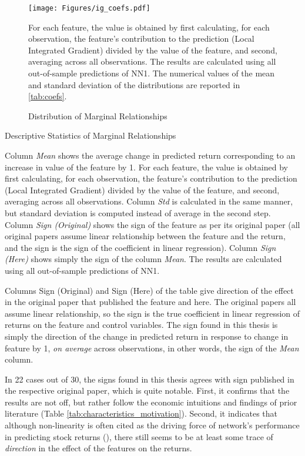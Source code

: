 	\begin{figure}
		\texttt{[image: Figures/ig\_coefs.pdf]}
		\caption{Distribution of Marginal Relationships}
		\label{fig:coefs}
		\medskip
		\small
		For each feature, the value is obtained by first calculating, for each observation, the feature's contribution to the prediction (Local Integrated Gradient) divided by the value of the feature, and second, averaging across all observations. The results are calculated using all out-of-sample predictions of NN1. The numerical values of the mean and standard deviation of the distributions are reported in \ref{tab:coefs}. 
	\end{figure} 
	
	\begin{table}
		\resizebox{\textwidth}{!}{}
		\caption{Descriptive Statistics of Marginal Relationships}
		\label{tab:coefs}
		\medskip
		\small
		Column \textit{Mean} shows the average change in predicted return corresponding to an increase in value of the feature by 1. For each feature, the value is obtained by first calculating, for each observation, the feature's contribution to the prediction (Local Integrated Gradient) divided by the value of the feature, and second, averaging across all observations. Column \textit{Std} is calculated in the same manner, but standard deviation is computed instead of average in the second step. Column \textit{Sign (Original)} shows the sign of the feature as per its original paper (all original papers assume linear relationship between the feature and the return, and the sign is the sign of the coefficient in linear regression). Column \textit{Sign (Here)} shows simply the sign of the column \textit{Mean}. The results are calculated using all out-of-sample predictions of NN1.
	\end{table}
	
	Columns Sign (Original) and Sign (Here) of the table give direction of the effect in the original paper that published the feature and here. The original papers all assume linear relationship, so the sign is the true coefficient in linear regression of returns on the feature and control variables. The sign found in this thesis is simply the direction of the change in predicted return in response to change in feature by 1, \textit{on average} across observations, in other words, the sign of the \textit{Mean} column. 
	
	In 22 cases out of 30, the signs found in this thesis agrees with sign published in the respective original paper, which is quite notable. First, it confirms that the results are not off, but rather follow the economic intuitions and findings of prior literature (Table \ref{tab:characteristics_motivation}). Second, it indicates that although non-linearity is often cited as the driving force of network's performance in predicting stock returns (\cite{gu2020empirical}), there still seems to be at least some trace of \textit{direction} in the effect of the features on the returns.   
	
